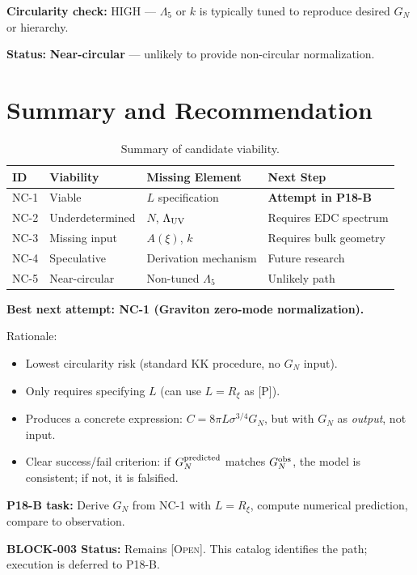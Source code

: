 \documentclass[11pt,a4paper]{article}
\newcommand{\Post}{\textsc{[P]}}
\newcommand{\Open}{\textsc{[Open]}}
\begin{document}
\textbf{Circularity check:} HIGH --- $\Lambda_5$ or $k$ is typically tuned
to reproduce desired $G_N$ or hierarchy.

\textbf{Status:} \textbf{Near-circular} --- unlikely to provide non-circular
normalization.

\section{Summary and Recommendation}

\begin{table}[h]
\centering
\begin{tabular}{llll}
\toprule
\textbf{ID} & \textbf{Viability} & \textbf{Missing Element} & \textbf{Next Step} \\
\midrule
NC-1 & Viable & $L$ specification & \textbf{Attempt in P18-B} \\
NC-2 & Underdetermined & $N$, $\Lambda_{\rm UV}$ & Requires EDC spectrum \\
NC-3 & Missing input & $A(\xi)$, $k$ & Requires bulk geometry \\
NC-4 & Speculative & Derivation mechanism & Future research \\
NC-5 & Near-circular & Non-tuned $\Lambda_5$ & Unlikely path \\
\bottomrule
\end{tabular}
\caption{Summary of candidate viability.}
\label{tab:summary}
\end{table}

\begin{statusbox}[Recommendation]
\textbf{Best next attempt: NC-1 (Graviton zero-mode normalization).}

Rationale:
\begin{itemize}
\item Lowest circularity risk (standard KK procedure, no $G_N$ input).
\item Only requires specifying $L$ (can use $L = R_\xi$ as \Post).
\item Produces a concrete expression: $C = 8\pi L \sigma^{3/4} G_N$, but
with $G_N$ as \textit{output}, not input.
\item Clear success/fail criterion: if $G_N^{\rm predicted}$ matches
$G_N^{\rm obs}$, the model is consistent; if not, it is falsified.
\end{itemize}

\textbf{P18-B task:} Derive $G_N$ from NC-1 with $L = R_\xi$, compute
numerical prediction, compare to observation.
\end{statusbox}

\textbf{BLOCK-003 Status:} Remains \Open. This catalog identifies the path;
execution is deferred to P18-B.
\end{document}
